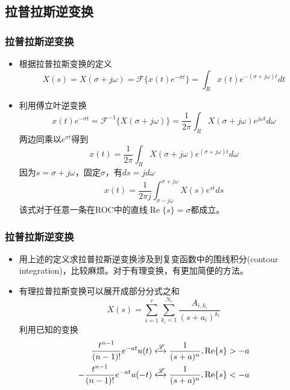 \documentclass[CJKutf8,dvipsnames,table]{beamer}
\begin{document}
\begin{CJK*}{UTF8}{song}
  \section{拉普拉斯逆变换}
  
  \begin{frame}
    \frametitle{拉普拉斯逆变换}
    \begin{itemize}
    \item 根据拉普拉斯变换的定义
	\[
    	X(s) = X(\sigma + j\omega) = \mathscr{F}\{ x(t) e^{-\sigma t} \}
	         = \int_R x(t)e^{-(\sigma + j\omega)t}dt 
	\]
	\item 利用傅立叶逆变换
	\[
    	x(t) e^{-\sigma t} = \mathscr{F}^{-1}\{ X(\sigma + j\omega) \}   
	                       = \frac{1}{2\pi}\int_R X(\sigma + j\omega)e^{j\omega t}d\omega 
	\]
	两边同乘以$e^{\sigma t}$得到
	\[
		x(t) = \frac{1}{2\pi}\int_R X(\sigma + j\omega)e^{(\sigma+j\omega) t}d\omega 
	\]
	因为$s=\sigma+j\omega$，固定$\sigma$，有$ds=jd\omega$
	\[
		x(t) = \frac{1}{2\pi j}\int_{\sigma-j\omega}^{\sigma+j\omega} X(s)e^{st}ds 	
	\]
	该式对于任意一条在ROC中的直线$\operatorname{Re}\{s\}=\sigma$都成立。
    \end{itemize}
  \end{frame}   

  \begin{frame}
    \frametitle{拉普拉斯逆变换}
    \begin{itemize}
    \item 用上述的定义求拉普拉斯逆变换涉及到复变函数中的围线积分(contour integration)，比较麻烦。对于有理变换，有更加简便的方法。
	\item 有理拉普拉斯变换可以展开成部分分式之和
	\[
		X(s) = \sum_{i=1}^{r} \sum_{k_i=1}^{N_i} \frac{A_{i,k_i}}{(s+a_i)^{k_i}}
	\]
	利用已知的变换
	\begin{align*}
		\frac{t^{n-1}}{(n-1)!}e^{-at}u(t) & \xleftrightarrow{\mathscr{L}} \frac{1}{(s+a)^n}, \operatorname{Re}\{s\} > -a \\
		-\frac{t^{n-1}}{(n-1)!}e^{-at}u(-t) & \xleftrightarrow{\mathscr{L}} \frac{1}{(s+a)^n}, \operatorname{Re}\{s\} < -a
	\end{align*}
    \end{itemize}
  \end{frame}   
    

\end{CJK*}
\end{document}
